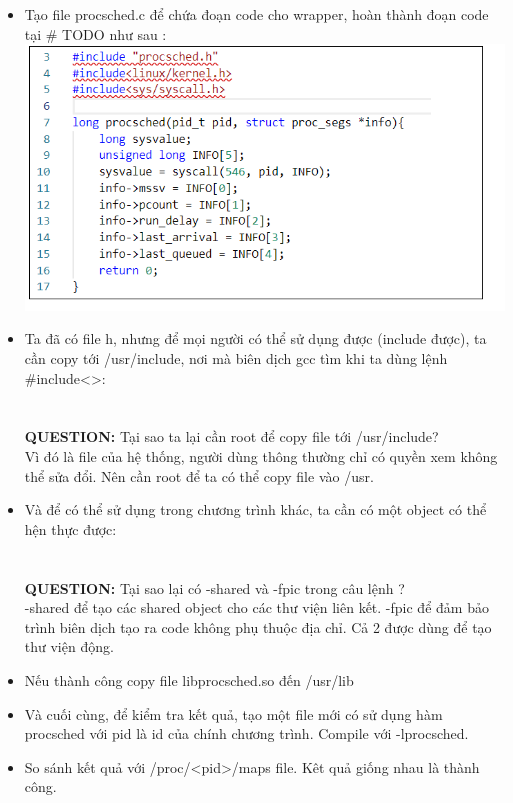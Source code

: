 \documentclass[a4paper]{article}
\begin{document}
\begin{itemize}
\item  Tạo file procsched.c để chứa đoạn code cho wrapper, hoàn thành đoạn code tại {\color{blue}\# TODO} như sau : \\
 \includegraphics[scale=1.00]{procsched.PNG}
\item Ta đã có file h, nhưng để mọi người có thể sử dụng được (include được), ta cần copy tới
/usr/include, nơi mà biên dịch gcc tìm khi ta dùng lệnh \#include<>:\\
\\
\\
\textbf{QUESTION:} Tại sao ta lại cần root để copy file tới /usr/include?\\
Vì đó là file của hệ thống, người dùng thông thường chỉ có quyền xem không thể sửa đổi. Nên cần root để ta có thể copy file vào /usr.
\item Và để có thể sử dụng trong chương trình khác, ta cần có một object có thể hện thực được:\\
\\
\\
\textbf{QUESTION:} Tại sao lại có -shared và -fpic trong câu lệnh ?\\
-shared để tạo các shared object cho các thư viện liên kết. -fpic để đảm bảo trình biên dịch tạo ra code không phụ thuộc địa chỉ. Cả 2 được dùng để tạo thư viện động.
\item Nếu thành công copy file libprocsched.so đến /usr/lib
\item Và cuối cùng, để kiểm tra kết quả, tạo một file mới có sử dụng hàm procsched với pid là id của chính chương trình. Compile với -lprocsched.
\item  So sánh kết quả với /proc/<pid>/maps file. Kêt quả giống nhau là thành công.
\end{itemize}
\end{document}
